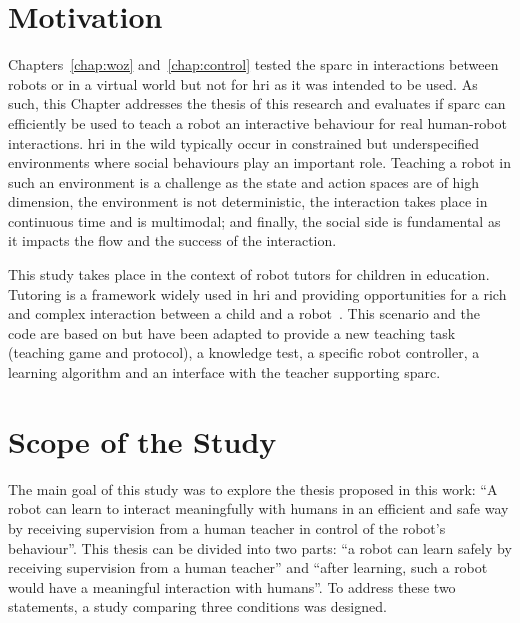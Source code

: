 \newpage

\section{Motivation}

Chapters~\ref{chap:woz} and~\ref{chap:control} tested the \gls{sparc} in interactions between robots or in a virtual world but not for \gls{hri} as it was intended to be used. As such, this Chapter addresses the thesis of this research and evaluates if \gls{sparc} can efficiently be used to teach a robot an interactive behaviour for real human-robot interactions. \gls{hri} in the wild typically occur in constrained but underspecified environments where social behaviours play an important role. Teaching a robot in such an environment is a challenge as the state and action spaces are of high dimension, the environment is not deterministic, the interaction takes place in continuous time and is multimodal; and finally, the social side is fundamental as it impacts the flow and the success of the interaction.

This study takes place in the context of robot tutors for children in education. Tutoring is a framework widely used in \gls{hri} and providing opportunities for a rich and complex interaction between a child and a robot~\citep{leyzberg2012physical,kennedy2015robot}. This scenario and the code are based on \cite{lemaignan2017free} but have been adapted to provide a new teaching task (teaching game and protocol), a knowledge test, a specific robot controller, a learning algorithm and an interface with the teacher supporting \gls{sparc}.


\section{Scope of the Study} \label{sec:tutoring_scope}

The main goal of this study was to explore the thesis proposed in this work: ``A robot can learn to interact meaningfully with humans in an efficient and safe way by receiving supervision from a human teacher in control of the robot's behaviour''. This thesis can be divided into two parts: ``a robot can learn safely by receiving supervision from a human teacher'' and ``after learning, such a robot would have a meaningful interaction with humans''. To address these two statements, a study comparing three conditions was designed. 

